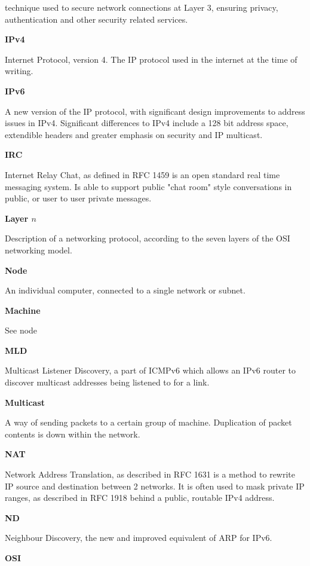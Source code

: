 technique used to secure network connections at Layer 3, ensuring
privacy, authentication and other security related services. 

\textbf{IPv4}

Internet Protocol, version 4. The IP protocol used in the internet
at the time of writing.

\textbf{IPv6}

A new version of the IP protocol, with significant design improvements
to address issues in IPv4. Significant differences to IPv4 include a
128 bit address space, extendible headers and greater emphasis on 
security and IP multicast.

\textbf{IRC}

Internet Relay Chat, as defined in RFC 1459 is an open standard real
time messaging system. Is able to support public "chat room" style
conversations in public, or user to user private messages.

\textbf{Layer $n$}

Description of a networking protocol, according to the seven layers of
the OSI networking model.

\textbf{Node}

An individual computer, connected to a single network or subnet.

\textbf{Machine}

See node

\textbf{MLD}

Multicast Listener Discovery, a part of ICMPv6 which allows an IPv6
router to discover multicast addresses being listened to for a link.

\textbf{Multicast}

A way of sending packets to a certain group of machine. Duplication of
packet contents is down within the network.

\textbf{NAT}

Network Address Translation, as described in RFC 1631 is a method
to rewrite IP source and destination between 2 networks. It is often
used to mask private IP ranges, as described in RFC 1918 behind a 
public, routable IPv4 address. 

\textbf{ND}

Neighbour Discovery, the new and improved equivalent of ARP for IPv6.

\textbf{OSI}

